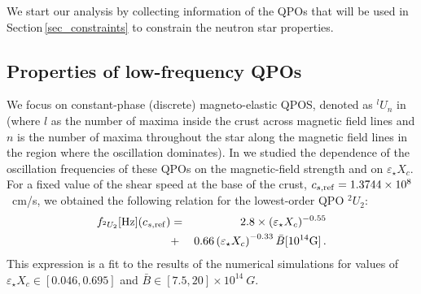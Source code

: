 \documentclass[useAMS,usenatbib]{mnras}
\begin{document}
We start our analysis by collecting information of the QPOs that will be used in 
Section\,\ref{sec_constraints} to constrain the neutron star properties.
\subsection{Properties of low-frequency QPOs}
\label{sec_lowest}

We focus on constant-phase (discrete) magneto-elastic QPOS, denoted as 
${}^l U_n$ in \cite{Gabler2016} (where $l$ as the number of maxima inside the 
crust across magnetic field lines and $n$ is the number of maxima throughout the 
star along the magnetic field lines in the region where the oscillation 
dominates). In \cite{Gabler2016} we studied the dependence of the oscillation 
frequencies of these QPOs on the magnetic-field strength and on 
$\varepsilon_\star X_c$. For a fixed value of the shear speed at the base of the 
crust, 
$c_{s,{\rm ref}}=1.3744\times 10^8$~cm/s, we obtained the following relation for the lowest-order QPO $^2U_2$:
%
\begin{eqnarray}
  f_{^2U_2}[\mathrm{Hz}] (c_{s, {\rm ref}})&=& 2.8\times(\varepsilon_\star 
X_c)^{-0.55} \nonumber \\
  &+& 0.66 \left(\varepsilon_\star X_c\right)^{-0.33}\bar B 
[10^{14}\mathrm{G}] 
\,. \label{eq:f2u2fit}
\end{eqnarray}
%
This expression is a fit to the results of the numerical simulations for values of $\varepsilon_\star X_c \in [0.046,0.695]$ and 
${\bar B} \in [7.5,20] \times10^{14}~G$.
\end{document}
